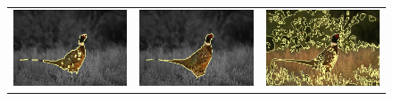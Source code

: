 \documentclass[runningheads]{llncs}
\begin{document}
\begin{figure}
\begin{tabular}{ccc}
		\includegraphics[scale=0.2]{images/segmentation/bc/bird/gc-seg.png} &
		\includegraphics[scale=0.2]{images/segmentation/bc/bird/corrected-seg.png} &
		\includegraphics[scale=0.2]{images/segmentation/schoenemann/bird/bird-seg.png}\\						

\end{tabular}
\end{figure}
\end{document}
